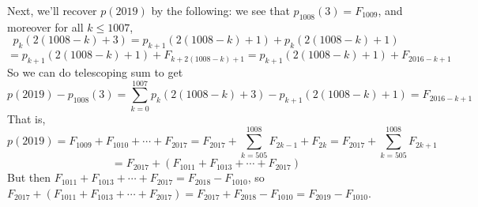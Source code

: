 \documentclass[11pt,a4paper]{article}
\newcommand{\<}{\langle}
\renewcommand{\>}{\rangle}
\begin{document}
\begin{enumerate}
    Next, we'll recover $p(2019)$ by the following: we see that $p_{1008}(3)=F_{1009}$, and moreover for all $k\le 1007$, 
    \[
    p_k(2(1008-k)+3) = p_{k+1}(2(1008-k)+1)+p_k(2(1008-k)+1)
    \]\[
    =p_{k+1}(2(1008-k)+1)+F_{k+2(1008-k)+1}
    =p_{k+1}(2(1008-k)+1)+F_{2016-k+1}
    \]
    So we can do telescoping sum to get 
    \[
    p(2019)-p_{1008}(3)
    =\sum_{k=0}^{1007} p_k(2(1008-k)+3)-p_{k+1}(2(1008-k)+1)
    =F_{2016-k+1}
    \]
    That is, 
    \[
    p(2019)=F_{1009}+F_{1010}+\cdots + F_{2017}
    =F_{2017}+\sum_{k=505}^{1008}F_{2k-1}+F_{2k}
    =F_{2017}+\sum_{k=505}^{1008}F_{2k+1}
    \]\[
    =F_{2017}+(F_{1011}+F_{1013}+\cdots + F_{2017})
    \]
    But then $F_{1011}+F_{1013}+\cdots + F_{2017}=F_{2018}-F_{1010}$, so 
    $F_{2017}+(F_{1011}+F_{1013}+\cdots + F_{2017})=F_{2017}+F_{2018}-F_{1010}=F_{2019}-F_{1010}$. 
    
\end{enumerate}
\end{document}
